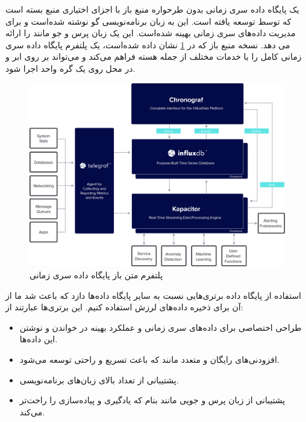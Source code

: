  یک پایگاه داده سری زمانی بدون طرحواره منبع باز با اجزای اختیاری منبع بسته است که توسط  توسعه یافته است. این به زبان برنامه‌نویسی گو نوشته شده‌است و برای مدیریت داده‌های سری زمانی بهینه شده‌است. این یک زبان پرس و جو مانند  را ارائه می دهد. نسخه منبع باز که در \cref{fig:influx} \cite{influx} نشان داده شده‌است، یک پلتفرم پایگاه داده سری زمانی کامل را با خدمات مختلف از جمله هسته  فراهم می‌کند و می‌تواند بر روی ابر و در محل روی یک گره واحد اجرا شود.

\begin{figure}[!h]
\centering\includegraphics[scale=.11]{influx.png}
\caption{پلتفرم متن باز پایگاه داده سری زمانی  \cite{influx}}\label{fig:influx}
\end{figure}

استفاده از پایگاه داده  برتری‌هایی نسبت به سایر پایگاه داده‌ها دازد که باعث شد ما از آن برای ذخیره داده‌های لرزش استفاده کنیم. این برتری‌ها عبارتند از:

\begin{itemize}
\item طراحی اختصاصی برای داده‌های سری زمانی و عملکرد بهینه در خواندن و نوشتن این داده‌ها.
\item افزودنی‌های رایگان و متعدد مانند  که باعث تسریع و راحتی توسعه می‌شود.
\item پشتیبانی از تعداد بالای زبان‌های برنامه‌نویسی.
\item پشتیبانی از زبان پرس و جویی مانند  بنام  که یادگیری و پیاده‌سازی را راحت‌تر می‌کند.
\end{itemize}


